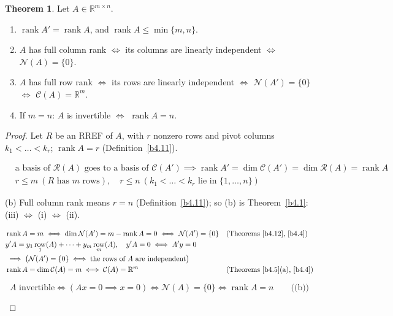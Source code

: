 \documentclass[12pt]{article}
\newcommand{\R}{\mathbb R}
\DeclareMathOperator{\rank}{rank}
\theoremstyle{definition}
\newtheorem{theorem}{Theorem}
\newcommand{\boardtop}{\vspace*{-\abovedisplayskip}}
\DeclareMathOperator{\row}{row}
\begin{document}
\begin{theorem}\label{b4.13}
Let \(A\in\R^{m\times n}\).
\begin{enumerate}
\item \(\rank A'=\rank A\), and \(\rank A\leqslant\min\{m,n\}\).
\item \(A\) has full column rank \(\iff\) its columns are linearly independent \(\iff\) \(\mathcal N(A)=\{0\}\).
\item \(A\) has full row rank \(\iff\) its rows are linearly independent \(\iff\) \(\mathcal N(A')=\{0\}\) \(\iff\)
\(\mathcal C(A)=\R^m\).
\item If \(m=n\): \(A\) is invertible \(\iff\) \(\rank A=n\).
\end{enumerate}
\end{theorem}
\begin{proof}
Let \(R\) be an RREF of \(A\), with \(r\) nonzero rows and pivot columns \(k_1<\dots<k_r\); \(\rank A=r\)
(Definition~\ref{b4.11}).
\begin{board}[(a) \((y'A)'=A'y\) (\lec{1}, \lit{Theorem~8}): transposing maps \(\mathcal R(A)\) onto
\(\mathcal C(A')\), keeps linear combinations and is undone by transposing again:]
\boardtop
\begin{align*}
&\text{a basis of }\mathcal R(A)\text{ goes to a basis of }\mathcal C(A')\implies
\rank A'=\dim\mathcal C(A')=\dim\mathcal R(A)=\rank A\\
&r\leqslant m\ (R\text{ has }m\text{ rows}),\quad r\leqslant n\ (k_1<\dots<k_r\text{ lie in }\{1,\dots,n\})
\end{align*}
\end{board}
(b) Full column rank means \(r=n\) (Definition~\ref{b4.11}); so (b) is Theorem~\ref{b4.1}: (iii)
\(\iff\) (i) \(\iff\) (ii).
\begin{board}
\boardtop
\begin{align*}
&\rank A=m\iff\dim\mathcal N(A')=m-\rank A=0\iff\mathcal N(A')=\{0\}&&\text{(Theorems~\ref{b4.12}, \ref{b4.4})}\\
&y'A=y_1\row_1(A)+\dots+y_m\row_m(A),\quad y'A=0\iff A'y=0\\
&\implies\bigl(\mathcal N(A')=\{0\}\iff\text{the rows of }A\text{ are independent}\bigr)\\
&\rank A=\dim\mathcal C(A)=m\iff\mathcal C(A)=\R^m&&\text{(Theorems~\ref{b4.5}(a), \ref{b4.4})}
\end{align*}
\end{board}
\begin{board}
\[
A\text{ invertible}\iff(Ax=0\implies x=0)\iff\mathcal N(A)=\{0\}\iff\rank A=n\qquad\text{((b))}
\]
\end{board}
\nopagebreak
\end{proof}
\end{document}

